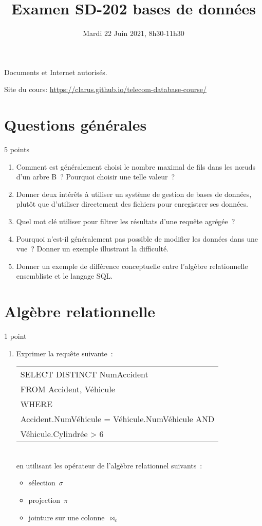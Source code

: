 \documentclass[a4paper,11pt]{article}
\title{Examen SD-202 bases de données}
\date{Mardi 22 Juin 2021, 8h30-11h30}
\begin{document}
\maketitle
{\large Documents et Internet autorisés.}

Site du cours: \url{https://clarus.github.io/telecom-database-course/}

\section{Questions générales}{5 points}
\begin{enumerate}
  \item Comment est généralement choisi le nombre maximal de fils dans les nœuds d'un arbre B~? Pourquoi choisir une telle valeur~?
  \item Donner deux intérêts à utiliser un système de gestion de bases de données, plutôt que d'utiliser directement des fichiers pour enregistrer ses données.
  \item Quel mot clé utiliser pour filtrer les résultats d'une requête agrégée~?
  \item Pourquoi n'est-il généralement pas possible de modifier les données dans une vue~? Donner un exemple illustrant la difficulté.
  \item Donner un exemple de différence conceptuelle entre l'algèbre relationnelle ensembliste et le langage SQL.
\end{enumerate}

\section{Algèbre relationnelle}{1 point}
\begin{enumerate}
  \item Exprimer la requête suivante~:\\
    \begin{tabular}{l}
      SELECT DISTINCT NumAccident\\
      FROM Accident, Véhicule\\
      WHERE\\
      \quad Accident.NumVéhicule = Véhicule.NumVéhicule AND\\
      \quad Véhicule.Cylindrée > 6\\
    \end{tabular}\\
    en utilisant les opérateur de l'algèbre relationnel suivants~:
    \begin{itemize}
      \item sélection~$\sigma$
      \item projection~$\pi$
      \item jointure sur une colonne~$\bowtie_c$
    \end{itemize}
\end{enumerate}
\end{document}
